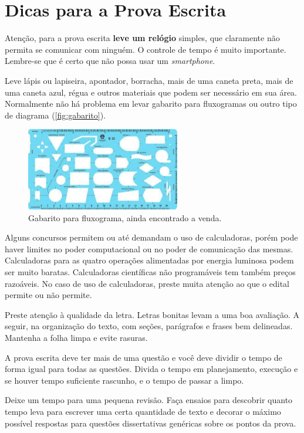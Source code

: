 \documentclass[12pt]{article}
\begin{document}
\section{Dicas para a Prova Escrita}

Atenção, para a prova escrita \textbf{leve um relógio} simples, que claramente não permita se comunicar com ninguém. O controle de tempo é muito importante. Lembre-se que é certo que  não possa usar um \textit{smartphone}.

Leve lápis ou lapiseira, apontador, borracha, mais de uma caneta preta, mais de uma caneta azul, régua e outros materiais que podem ser necessário em sua área. Normalmente não há problema em levar gabarito para fluxogramas ou outro tipo de diagrama (\autoref{fig:gabarito}).

\begin{figure}
    \centering
    \includegraphics[width=0.6\textwidth]{gabaritofluxograma.png}
    \caption{Gabarito para fluxograma, ainda encontrado a venda.}
    \label{fig:gabarito}
\end{figure}


Alguns concursos permitem ou até demandam o uso de calculadoras, porém pode haver limites no poder computacional ou no poder de comunicação das mesmas. Calculadoras para as quatro operações alimentadas por energia luminosa podem ser muito baratas. Calculadoras científicas não programáveis tem também preços razoáveis. No caso de uso de calculadoras, preste muita atenção ao que o edital permite ou não permite.

Preste atenção à qualidade da letra. Letras bonitas levam a uma boa avaliação. A seguir, na organização do texto, com seções, parágrafos e frases bem delineadas. Mantenha a folha limpa e evite rasuras.

A prova escrita deve ter mais de uma questão e você deve dividir o tempo de forma igual para todas as questões.
Divida o tempo em planejamento, execução e se houver tempo suficiente rascunho, e o tempo de passar a limpo.

Deixe um tempo para uma pequena revisão. Faça ensaios para descobrir quanto tempo leva para escrever uma certa quantidade de texto e decorar o máximo possível respostas para questões dissertativas genéricas sobre os pontos da prova.
\end{document}

